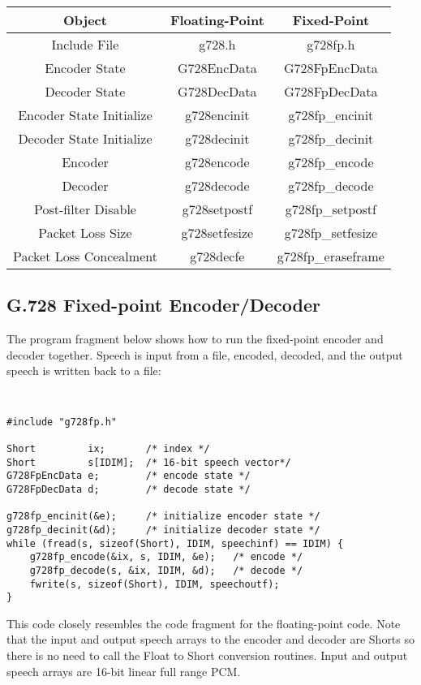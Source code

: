 \begin{center}
\begin{tabular} { | c | c | c | }
 \hline
Object & Floating-Point & Fixed-Point \\ \hline
Include File & g728.h & g728fp.h \\ \hline
Encoder State & G728EncData & G728FpEncData \\ \hline
Decoder State & G728DecData & G728FpDecData \\ \hline
Encoder State Initialize & g728encinit & g728fp\_encinit \\ \hline
Decoder State Initialize & g728decinit & g728fp\_decinit \\ \hline
Encoder & g728encode & g728fp\_encode \\ \hline
Decoder & g728decode & g728fp\_decode \\ \hline
Post-filter Disable & g728setpostf & g728fp\_setpostf \\ \hline
Packet Loss Size & g728setfesize & g728fp\_setfesize \\ \hline
Packet Loss Concealment & g728decfe & g728fp\_eraseframe \\ \hline
\end{tabular}
\end{center}

\subsection {G.728 Fixed-point Encoder/Decoder}

The program fragment below shows how to run the fixed-point encoder and
decoder together. Speech is input from a file, encoded, decoded, and
the output speech is written back to a file:

{\tt\small
\begin{verbatim}
#include "g728fp.h"

Short         ix;       /* index */
Short         s[IDIM];  /* 16-bit speech vector*/
G728FpEncData e;        /* encode state */
G728FpDecData d;        /* decode state */

g728fp_encinit(&e);     /* initialize encoder state */
g728fp_decinit(&d);     /* initialize decoder state */
while (fread(s, sizeof(Short), IDIM, speechinf) == IDIM) {
    g728fp_encode(&ix, s, IDIM, &e);   /* encode */
    g728fp_decode(s, &ix, IDIM, &d);   /* decode */
    fwrite(s, sizeof(Short), IDIM, speechoutf);
}
\end{verbatim}
}

This code closely resembles the code fragment for the floating-point code.
Note that the input and output speech arrays to the encoder and decoder
are Shorts so there is no need to call the Float to Short conversion routines.
Input and output speech arrays are 16-bit linear full range PCM.

